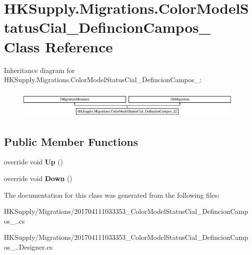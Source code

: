 \hypertarget{class_h_k_supply_1_1_migrations_1_1_color_model_status_cial___defincion_campos__22}{}\section{H\+K\+Supply.\+Migrations.\+Color\+Model\+Status\+Cial\+\_\+\+Defincion\+Campos\+\_ Class Reference}
\label{class_h_k_supply_1_1_migrations_1_1_color_model_status_cial___defincion_campos__22}
Inheritance diagram for H\+K\+Supply.\+Migrations.\+Color\+Model\+Status\+Cial\+\_\+\+Defincion\+Campos\+\_\+:\begin{figure}[H]
\begin{center}
\leavevmode
\includegraphics[height=1.428571cm]{class_h_k_supply_1_1_migrations_1_1_color_model_status_cial___defincion_campos__22}
\end{center}
\end{figure}
\subsection*{Public Member Functions}
\begin{DoxyCompactItemize}
\item 
\mbox{\label{class_h_k_supply_1_1_migrations_1_1_color_model_status_cial___defincion_campos__22_a1f6678ab47dcbe5b1953a37b13a73411}} 
override void {\bfseries Up} ()
\item 
\mbox{\label{class_h_k_supply_1_1_migrations_1_1_color_model_status_cial___defincion_campos__22_a0570509c6d6ce0be01ba6a1c15a0c2f3}} 
override void {\bfseries Down} ()
\end{DoxyCompactItemize}


The documentation for this class was generated from the following files\+:\begin{DoxyCompactItemize}
\item 
H\+K\+Supply/\+Migrations/201704111033353\+\_\+\+Color\+Model\+Status\+Cial\+\_\+\+Defincion\+Campos\+\_..\+cs\item 
H\+K\+Supply/\+Migrations/201704111033353\+\_\+\+Color\+Model\+Status\+Cial\+\_\+\+Defincion\+Campos\+\_..\+Designer.\+cs\end{DoxyCompactItemize}

